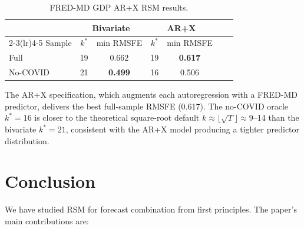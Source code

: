 \documentclass[12pt,a4paper]{article}
\theoremstyle{definition}
\begin{document}
\begin{table}[ht]
\centering
\caption{FRED-MD GDP AR+X RSM results.}
\label{tab:gdp_arx}
\begin{tabular}{lcccccc}
\toprule
 & \multicolumn{2}{c}{Bivariate} & \multicolumn{2}{c}{AR+X} \\
\cmidrule(lr){2-3}\cmidrule(lr){4-5}
Sample & $k^*$ & min RMSFE & $k^*$ & min RMSFE \\
\midrule
Full     & 19 & 0.662 & 19 & \textbf{0.617} \\
No-COVID & 21 & \textbf{0.499} & 16 & 0.506 \\
\bottomrule
\end{tabular}
\end{table}

The AR+X specification, which augments each autoregression with a FRED-MD
predictor, delivers the best full-sample RMSFE (0.617).  The no-COVID
oracle $k^*=16$ is closer to the theoretical square-root default
$k\approx\lfloor\sqrt{T}\rfloor\approx 9$--14 than the bivariate $k^*=21$,
consistent with the AR+X model producing a tighter predictor distribution.

\section{Conclusion}
\label{sec:conclusion}

We have studied RSM for forecast combination from first principles.  The
paper's main contributions are:
\end{document}
